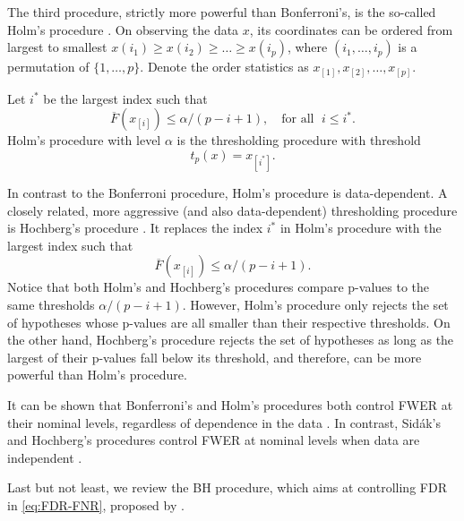 The third procedure, strictly more powerful than Bonferroni's, is the so-called Holm's procedure \citep{holm1979simple}.
On observing the data $x$, its coordinates can be ordered from largest to smallest
$x(i_1) \ge x(i_2)  \ge \ldots \ge x(i_p)$,
where $(i_1, \ldots, i_p)$ is a permutation of $\{1, \ldots, p\}$. 
Denote the order statistics as $x_{[1]}, x_{[2]}, \ldots, x_{[p]}$.
\begin{definition}
Let $i^*$ be the largest index such that
$$
\overline{F}(x_{[i]}) \le \alpha / (p-i+1),\quad \text{for all }\;i\le i^*.
$$
Holm's procedure with level $\alpha$ is the thresholding procedure with threshold
\begin{equation} \label{eq:Holm-procedure}
    t_p(x) = x_{[i^*]}.
\end{equation}
\end{definition}
In contrast to the Bonferroni procedure, Holm's procedure is data-dependent.
A closely related, more aggressive (and also data-dependent) thresholding procedure is Hochberg's procedure \citep{hochberg1988sharper}.
It replaces the index $i^*$ in Holm's procedure with the largest index such that
$$
\overline{F}(x_{[i]}) \le \alpha / (p-i+1).
$$
Notice that both Holm's and Hochberg's procedures compare p-values to the same thresholds $\alpha / (p-i+1)$.
However, Holm's procedure only rejects the set of hypotheses whose p-values are all smaller than their respective thresholds.
On the other hand, Hochberg's procedure rejects the set of hypotheses as long as the largest of their p-values fall below its threshold, and therefore, can be more powerful than Holm's procedure. 

It can be shown that Bonferroni's and Holm's procedures both control FWER at their nominal levels, regardless of dependence in the 
data \citep{holm1979simple}. In contrast, Sid\'ak's and Hochberg's procedures control FWER at nominal levels when data are independent \citep{vsidak1967rectangular, hochberg1988sharper}. 

Last but not least, we review the \ac{BH} procedure, which aims at controlling \ac{FDR} in 
\eqref{eq:FDR-FNR}, proposed by  \cite{benjamini1995controlling}.

